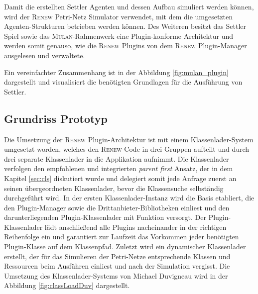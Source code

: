 		Damit die erstellten Settler Agenten und dessen Aufbau simuliert werden können, wird der \textsc{Renew} Petri-Netz Simulator verwendet, mit dem die umgesetzten Agenten-Strukturen betrieben werden können.\newline
		Des Weiteren besitzt das Settler Spiel sowie das \textsc{Mulan}-Rahmenwerk eine Plugin-konforme Architektur und werden somit genauso, wie die \textsc{Renew} Plugins von dem \textsc{Renew} Plugin-Manager ausgelesen und verwaltete.\bigbreak

		Ein vereinfachter Zusammenhang ist in der Abbildung \ref{fig:mulan_plugin} dargestellt und visualisiert die benötigten Grundlagen für die Ausführung von Settler.


	\subsection{Grundriss Prototyp} \label{sec:zustandRNW}
		Die Umsetzung der \textsc{Renew} Plugin-Architektur ist mit einem Klassenlader-System umgesetzt worden, welches den \textsc{Renew}-Code in drei Gruppen aufteilt und durch drei separate Klassenlader in die Applikation aufnimmt. Die Klassenlader verfolgen den empfohlenen und integrierten \textit{parent first} Ansatz, der in dem Kapitel \ref{sec:cls} diskutiert wurde und delegiert somit jede Anfrage zuerst an seinen übergeordneten Klassenlader, bevor die Klassensuche selbständig durchgeführt wird. \newline
		In der ersten Klassenlader-Instanz wird die Basis etabliert, die den Plugin-Manager sowie die Drittanbieter-Bibliotheken einliest und den darunterliegenden Plugin-Klassenlader mit Funktion versorgt. Der Plugin-Klassenlader lädt anschließend alle Plugins nacheinander in der richtigen Reihenfolge ein und garantiert zur Laufzeit das Vorkommen jeder benötigten Plugin-Klasse auf dem Klassenpfad. Zuletzt wird ein dynamischer Klassenlader erstellt, der für das Simulieren der Petri-Netze entsprechende Klassen und Ressourcen beim Ausführen einliest und nach der Simulation vergisst. \newline
		Die Umsetzung des Klassenlader-Systems von Michael Duvigneau wird in der Abbildung \ref{fig:classLoadDuv} dargestellt. \bigbreak
